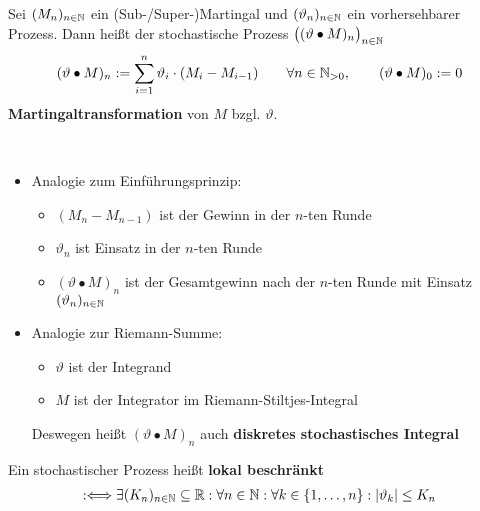 \begin{defi} %
	Sei $(M_n)_{n\in\mathbb{N}}$ ein (Sub-/Super-)Martingal und $(\vartheta_n)_{n\in\mathbb{N}}$ ein vorhersehbarer Prozess.
	Dann heißt der stochastische Prozess $\big((\vartheta\bullet M)_n\big)_{n\in\mathbb{N}}$
	\begin{align*}
		(\vartheta\bullet M)_n:=\sum\limits_{i=1}^n\vartheta_i\cdot(M_i-M_{i-1})\qquad\forall n\in\mathbb{N}_{>0},\qquad(\vartheta\bullet M)_0:=0
	\end{align*} 
	\textbf{Martingaltransformation} von $M$ bzgl. $\vartheta$.
\end{defi}

\begin{bemerkung}\ %
	\begin{itemize}
		\item Analogie zum Einführungsprinzip:
		\begin{itemize}
			\item $(M_n-M_{n-1})$ ist der Gewinn in der $n$-ten Runde
			\item $\vartheta_n$ ist Einsatz in der $n$-ten Runde
			\item $(\vartheta\bullet M)_n$ ist der Gesamtgewinn nach der $n$-ten Runde mit Einsatz $(\vartheta_n)_{n\in\mathbb{N}}$
		\end{itemize}
		\item Analogie zur Riemann-Summe:
		\begin{itemize}
			\item $\vartheta$ ist der Integrand
			\item $M$ ist der Integrator im Riemann-Stiltjes-Integral
		\end{itemize}
		Deswegen heißt $(\vartheta\bullet M)_n$ auch \textbf{diskretes stochastisches Integral}
	\end{itemize}
\end{bemerkung}

\begin{defi} %
	Ein stochastischer Prozess heißt \textbf{lokal beschränkt}
	\begin{align*}
		:\Longleftrightarrow\exists(K_n)_{n\in\mathbb{N}}\subseteq\mathbb{R}:\forall n\in\mathbb{N}:\forall k\in\lbrace1,\ldots,n\rbrace:|\vartheta_k|\leq K_n
	\end{align*}
\end{defi}

